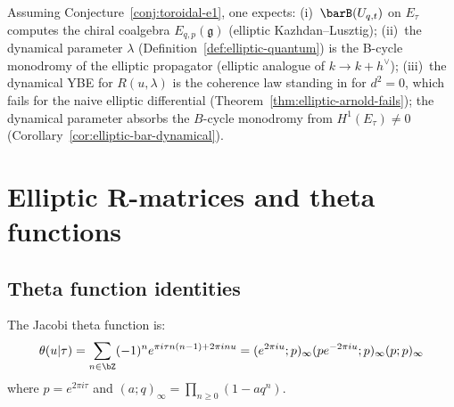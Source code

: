 \begin{remark}
\label{rem:elliptic-qg-bar}
Assuming Conjecture~\ref{conj:toroidal-e1}, one expects:
(i)~$\barB(U_{q,t})$ on $E_\tau$ computes the chiral coalgebra $E_{q,p}(\mathfrak{g})$ (elliptic Kazhdan--Lusztig);
(ii)~the dynamical parameter $\lambda$ (Definition~\ref{def:elliptic-quantum}) is the B-cycle monodromy of the elliptic propagator (elliptic analogue of $k \to k + h^\vee$);
(iii)~the dynamical YBE for $R(u,\lambda)$ is the coherence law standing in for $d^2 = 0$, which fails for the naive elliptic differential (Theorem~\ref{thm:elliptic-arnold-fails}); the dynamical parameter absorbs the $B$-cycle monodromy from $H^1(E_\tau) \neq 0$ (Corollary~\ref{cor:elliptic-bar-dynamical}).
\end{remark}

\section{Elliptic R-matrices and theta functions}
\label{sec:elliptic-r-theta}

\subsection{Theta function identities}

\begin{definition}\label{def:theta}
The Jacobi theta function is:
\[
\theta(u | \tau) = \sum_{n \in \bZ} (-1)^n e^{\pi i \tau n(n-1) + 2\pi i n u} =
(e^{2\pi iu}; p)_\infty (p e^{-2\pi iu}; p)_\infty (p; p)_\infty
\]
where $p = e^{2\pi i \tau}$ and $(a; q)_\infty = \prod_{n \geq 0}(1 - aq^n)$.
\end{definition}

